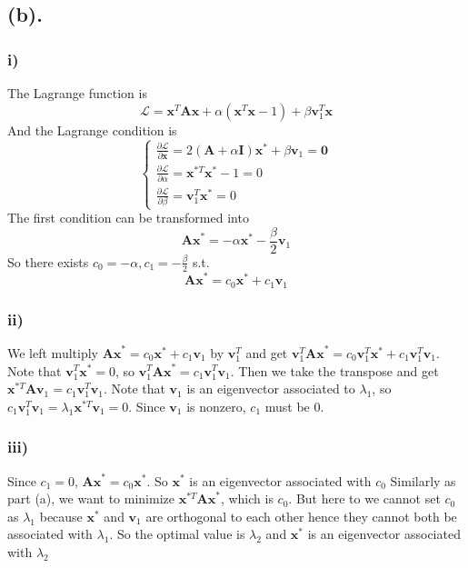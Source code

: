 \documentclass[12pt,letterpaper]{article}
\begin{document}
\subsection*{(b).}
\subsubsection*{i)}
The Lagrange function is
$$\mathcal{L}=\boldsymbol{x}^T\boldsymbol{Ax}+\alpha(\boldsymbol{x}^T\boldsymbol{x}-1)+\beta\boldsymbol{v}_1^T\boldsymbol{x}$$
And the Lagrange condition is 
$$\begin{cases}
\frac{\partial\mathcal{L}}{\partial \boldsymbol{x}}=2(\boldsymbol{A}+\alpha\boldsymbol{I})\boldsymbol{x^*}+\beta\boldsymbol{v}_1=\boldsymbol{0}\\
\frac{\partial\mathcal{L}}{\partial\alpha}=\boldsymbol{x}^{*T}\boldsymbol{x}^*-1=0\\
\frac{\partial\mathcal{L}}{\partial\beta}=\boldsymbol{v}_1^T\boldsymbol{x}^*=0
\end{cases}$$
The first condition can be transformed into $$\boldsymbol{Ax}^*=-\alpha\boldsymbol{x}^*-\frac{\beta}{2}\boldsymbol{v}_1$$
So there exists $c_0=-\alpha,c_1=-\frac{\beta}{2}$ s.t.
$$\boldsymbol{Ax}^*=c_0\boldsymbol{x}^*+c_1\boldsymbol{v}_1$$
\subsubsection*{ii)}
We left multiply $\boldsymbol{Ax}^*=c_0\boldsymbol{x}^*+c_1\boldsymbol{v}_1$ by $\boldsymbol{v}_1^T$ and get $\boldsymbol{v}_1^T\boldsymbol{Ax}^*=c_0\boldsymbol{v}_1^T\boldsymbol{x}^*+c_1\boldsymbol{v}_1^T\boldsymbol{v}_1$. Note that $\boldsymbol{v}_1^T\boldsymbol{x}^*=0$, so $\boldsymbol{v}_1^T\boldsymbol{Ax}^*=c_1\boldsymbol{v}_1^T\boldsymbol{v}_1$. Then we take the transpose and get $\boldsymbol{x}^{*T}\boldsymbol{Av}_1=c_1\boldsymbol{v}_1^T\boldsymbol{v}_1$. Note that $\boldsymbol{v}_1$ is an eigenvector associated to $\lambda_1$, so $c_1\boldsymbol{v}_1^T\boldsymbol{v}_1=\lambda_1\boldsymbol{x}^{*T}\boldsymbol{v}_1=0$. Since $\boldsymbol{v}_1$ is nonzero, $c_1$ must be 0.
\subsubsection*{iii)}
Since $c_1=0$, $\boldsymbol{Ax}^*=c_0\boldsymbol{x}^*$. So $\boldsymbol{x}^*$ is an eigenvector associated with $c_0$ Similarly as part (a), we want to minimize $\boldsymbol{x}^{*T}\boldsymbol{Ax}^*$, which is $c_0$. But here to we cannot set $c_0$ as $\lambda_1$ because $\boldsymbol{x}^*$ and $\boldsymbol{v}_1$ are orthogonal to each other hence they cannot both be associated with $\lambda_1$. So the optimal value is $\lambda_2$ and $\boldsymbol{x}^*$ is an eigenvector associated with $\lambda_2$
\end{document}
